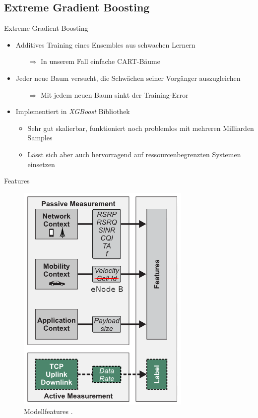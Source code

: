 \subsection{Extreme Gradient Boosting}

\begin{frame}{Extreme Gradient Boosting}
    \begin{itemize}
        \item Additives Training eines Ensembles aus  \glqq schwachen \grqq{} Lernern
        \begin{itemize}
            \item[$\Rightarrow$] In unserem Fall einfache CART-B\"aume
        \end{itemize}
        \item Jeder neue Baum versucht, die Schw\"achen seiner Vorg\"anger auszugleichen
        \begin{itemize}
            \item[$\Rightarrow$] Mit jedem neuen Baum sinkt der Training-Error
        \end{itemize}
        \item Implementiert in \textit{XGBoost} Bibliothek
        \begin{itemize}
            \item Sehr gut skalierbar, funktioniert noch problemlos mit mehreren Milliarden Samples
            \item L\"asst sich aber auch hervorragend auf ressourcenbegrenzten Systemen einsetzen \cite{XGBoost}
        \end{itemize}
    \end{itemize}
\end{frame}

\begin{frame}{Features}
    \begin{figure}[h]
		\centering
		\includegraphics[height=0.75\textheight]{grafiken/features}
		\caption{Modellfeatures \cite{IEEE}.}
		\label{features}
	\end{figure}
\end{frame}

